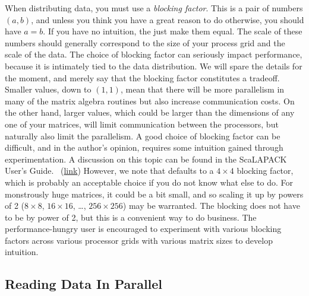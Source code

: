 When distributing data, you must use a \emph{blocking factor}.  This is a pair of numbers $(a,b)$, and unless you think you have a great reason to do otherwise, you should have $a=b$.  If you have no intuition, the just make them equal.  The scale of these numbers should generally correspond to the size of your process grid and the scale of the data.  The choice of blocking factor can seriously impact performance, because it is intimately tied to the data distribution.  We will spare the details for the moment, and merely say that the blocking factor constitutes a tradeoff.  Smaller values, down to $(1,1)$, mean that there will be more parallelism in many of the matrix algebra routines but also increase communication costs.  On the other hand, larger values, which could be larger than the dimensions of any one of your matrices, will limit communication between the processors, but naturally also limit the parallelism.
\np
A good choice of blocking factor can be difficult, and in the author's opinion, requires some intuition gained through experimentation.  A discussion on this topic can be found in the ScaLAPACK User's Guide.~\citep{slug} (\href{http://www.netlib.org/utk/papers/scalapack/node19.html}{link}) However, we note that  defaults to a $4\times 4$ blocking factor, which is probably an acceptable choice if you do not know what else to do.  For monstrously huge matrices, it could be a bit small, and so scaling it up by powers of 2 ($8\times 8$, $16\times 16$, \dots, $256\times 256$) may be warranted.  The blocking does not have to be by power of 2, but this is a convenient way to do business.  The performance-hungry user is encouraged to experiment with various blocking factors across various processor grids with various matrix sizes to develop intuition.

\subsection[]{Reading Data In Parallel}

